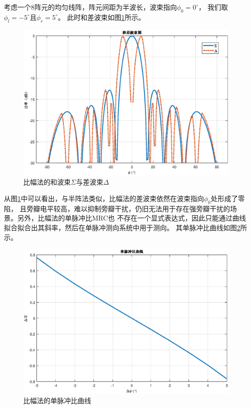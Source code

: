 \documentclass[master]{thesis-uestc}
\begin{document}
考虑一个$8$阵元的均匀线阵，阵元间距为半波长，波束指向$\phi_0=0^\circ$，
我们取$\phi_l=-5^\circ$且$\phi_r=5^\circ$。
此时和差波束如图\ref{ACM_sigma_delta}所示。
\begin{figure}[h]
    \includegraphics[scale=0.5]{pic/ACM_sigma_delta.eps}
    \caption{比幅法的和波束$\Sigma$与差波束$\Delta$}
    \label{ACM_sigma_delta}
\end{figure}

从图\ref{ACM_sigma_delta}中可以看出，与半阵法类似，比幅法的差波束依然在波束指向$\phi_0$处形成了零陷，
且旁瓣电平较高，难以抑制旁瓣干扰，仍旧无法用于存在强旁瓣干扰的场景。另外，比幅法的单脉冲比MRC也
不存在一个显式表达式，因此只能通过曲线拟合拟合出其斜率，然后在单脉冲测向系统中用于测向。
其单脉冲比曲线如图\ref{ACM_MRC_figure}所示。
\begin{figure}[h]
    \includegraphics[scale=0.5]{pic/ACM_MRC.eps}
    \caption{比幅法的单脉冲比曲线}
    \label{ACM_MRC_figure}
\end{figure}
\end{document}
